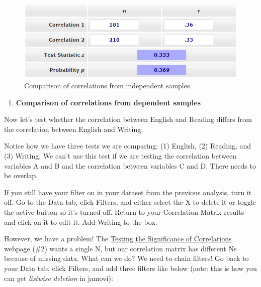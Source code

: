 \documentclass[
]{book}
\providecommand{\tightlist}{%
  \setlength{\itemsep}{0pt}\setlength{\parskip}{0pt}}
\begin{document}
\begin{figure}

{\centering \includegraphics[width=1\linewidth]{images/08-correlation/compare-correlations-independent} 

}

\caption{Comparison of correlations from independent samples}\label{fig:unnamed-chunk-10}
\end{figure}

\begin{enumerate}
\def\labelenumi{\arabic{enumi}.}
\setcounter{enumi}{1}
\tightlist
\item
  \textbf{Comparison of correlations from dependent samples}
\end{enumerate}

Now let's test whether the correlation between English and Reading differs from the correlation between English and Writing.

Notice how we have three tests we are comparing: (1) English, (2) Reading, and (3) Writing. We can't use this test if we are testing the correlation between variables A and B and the correlation between variables C and D. There needs to be overlap.

If you still have your filter on in your dataset from the previous analysis, turn it off. Go to the Data tab, click Filters, and either select the X to delete it or toggle the active button so it's turned off. Return to your Correlation Matrix results and click on it to edit it. Add Writing to the box.

However, we have a problem! The \href{https://www.psychometrica.de/correlation.html}{Testing the Significance of Correlations} webpage (\#2) wants a single N, but our correlation matrix has different Ns because of missing data. What can we do? We need to chain filters! Go back to your Data tab, click Filters, and add three filters like below (note: this is how you can get \emph{listwise deletion} in jamovi):
\end{document}
